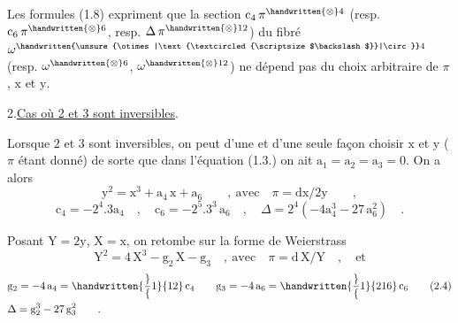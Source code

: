 Les formules (1.8) expriment que la section $\mathrm{c}_{4}\,\pi^{\handwritten{\otimes}4}$ (resp. $\mathrm{c}_{6}\,\pi^{\handwritten{\otimes}6}$, resp. $\Delta\,\pi^{\handwritten{\otimes}12}$) du fibré $\omega^{\handwritten{\unsure{\otimes|\text{\textcircled{\scriptsize$\backslash$}}|\circ}}4}$ (resp. $\omega^{\handwritten{\otimes}6}$, $\omega^{\handwritten{\otimes}12}$) ne dépend pas du choix arbitraire de $\pi$, $\mathrm{x}$ et $\mathrm{y}$.
\par\noindent\hfill
{}
\par\vspace{7.7\baselineskip}

2.\qquad \uline{Cas où 2 et 3 sont inversibles}.\margin{\handwritten{$\backslash$}}

Lorsque $2$ et $3$ sont inversibles, on peut d'une et d'une seule façon choisir $\mathrm{x}$ et $\mathrm{y}$ ($\pi$ étant donné) de sorte que dans l'équation (1.3.) on ait $\mathrm{a}_{1}=\mathrm{a}_{2}=\mathrm{a}_{3}=0$. On a alors
\[
\mathrm{y}^{2}=\mathrm{x}^{3}+\mathrm{a}_{4}\,\mathrm{x}+\mathrm{a}_{6}\qquad,\ \text{avec}\quad\pi=\mathrm{dx}/2\mathrm{y}\qquad,
\tag*{(2.1)}
\]
\[
\mathrm{c}_{4}=-2^{4}.3\mathrm{a}_{4}\quad,\quad
\mathrm{c}_{6}=-2^{5}.3^{3}\,\mathrm{a}_{6}\quad,\quad
\Delta=2^{4}(-4\mathrm{a}_{4}^{3}-27\,\mathrm{a}_{6}^{2})\quad.
\tag*{(2.2)}
\]

Posant $\mathrm{Y}=2\mathrm{y}$, $\mathrm{X}=\mathrm{x}$, on retombe sur la forme de Weierstrass
\[
\mathrm{Y}^{2}=4\,\mathrm{X}^{3}-\mathrm{g}_{2}\,\mathrm{X}-\mathrm{g}_{3}\quad,\ \text{avec}\quad\pi=\mathrm{d}\,\mathrm{X}/\mathrm{Y}\quad,\quad\text{et}
\tag*{(2.3)}
\]
\[
\begin{aligned}[t]
&\mathrm{g}_{2}=-4\,\mathrm{a}_{4}=\handwritten{\frac}{1}{12}\,\mathrm{c}_{4}\qquad
\mathrm{g}_{3}=-4\,\mathrm{a}_{6}=\handwritten{\frac}{1}{216}\,\mathrm{c}_{6}\\
&\Delta=\mathrm{g}_{2}^{3}-27\,\mathrm{g}_{3}^{2}\qquad.
\end{aligned}
\tag*{(2.4)}
\]


